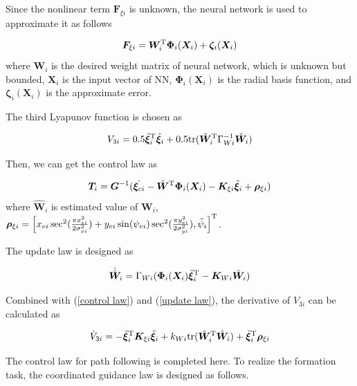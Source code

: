 \documentclass[conference,letterpaper,10.5pt]{IEEEtran}
\begin{document}
Since the nonlinear term $\bm{F}_{\xi i}$ is unknown, the neural network is used to approximate it as follows

\begin{equation}
	\bm{F}_{\xi i}=\bm{W}^{\rm T}_i\bm{\Phi}_i(\bm{X}_i)+\bm{\zeta}_i(\bm{X}_i)
\end{equation}
where $\bm{W}_i$ is the desired weight matrix of neural network, which is unknown but bounded, $\bm{X}_i$ is the input vector of NN, $\bm{\Phi}_i(\bm{X}_i)$ is the radial basis function, and $\bm{\zeta}_i(\bm{X}_i)$ is the approximate error.  

The third Lyapunov function is chosen as

\begin{equation}
	V_{3i}=0.5\tilde{\bm{\xi}}^{\rm T}_i\tilde{\bm{\xi}}_i+0.5{\rm tr}(\tilde{\bm{W}}^{\rm T}_i\Gamma^{-1}_{Wi}\tilde{\bm{W}}_i)
\end{equation}

Then, we can get the control law as

\begin{equation}\label{control law}
	\bm{T}_i=\bm{G}^{-1}(\dot{\bm{\xi}_{ci}}-\hat{\bm{W}}^{\rm T}\bm{\Phi}_i(\bm{X}_i)-\bm{K}_{\xi i}\tilde{\bm{\xi}}_i+\bm{\rho}_{\xi i})
\end{equation}
where $\hat{\bm{W}}_i$ is estimated value of $\bm{W}_i$, $\bm{\rho}_{\xi i}=\left[x_{ei}\sec^2(\frac{\pi x^2_{ei}}{2\sigma^2_{xi}})+y_{ei}\sin(\psi_{ei})\sec^2(\frac{\pi y^2_{ei}}{2\sigma^2_{yi}}),\tilde{\psi}_i\right]^{\rm T}$.

The update law is designed as

\begin{equation}\label{update law}
	\dot{\hat{\bm{W}}}_i=\Gamma_{Wi}(\bm{\Phi}_i(\bm{X}_i)\tilde{\bm{\xi}}^{\rm T}_i-\bm{K}_{Wi}\hat{\bm{W}}_i)
\end{equation}

Combined with (\ref{control law}) and (\ref{update law}), the derivative of $V_{3i}$ can be calculated as

\begin{equation}\label{V3dot}
	\dot{V}_{3i}=-\tilde{\bm{\xi}}^{\rm T}_i\bm{K}_{\xi i}\tilde{\bm{\xi}}_i+k_{Wi}{\rm tr}(\tilde{\bm{W}}^{\rm T}_i\hat{\bm{W}}_i)+\tilde{\bm{\xi}}^{\rm T}_i\bm{\rho}_{\xi i}
\end{equation}

The control law for path following is completed here. To realize the formation task, the coordinated guidance law is designed as follows.
\end{document}

